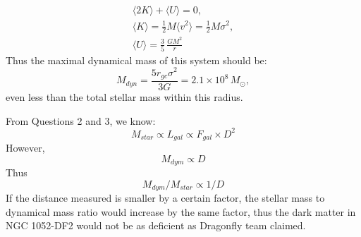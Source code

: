 \begin{description}
  \begin{gather*}
  \langle 2K \rangle + \langle U \rangle = 0, \\
  \langle K \rangle = \tfrac{1}{2}M\langle v^2 \rangle
  = \tfrac{1}{2}M\sigma^2, \\
  \langle U \rangle = \frac{3}{5}\,\frac{GM^2}{r}
  \tag*{(4 points)}
  \end{gather*}
  Thus the maximal dynamical mass of this system should be:
  \begin{equation*}
  M_{dyn} = \frac{5 r_{gc}\sigma^2}{3G} = 2.1 \times 10^{8}\,M_\odot,
  \tag*{(3 points)}
  \end{equation*}
  even less than the total stellar mass within this radius.
\item[(4)] From Questions 2 and 3, we know:
  \[
  M_{star} \propto L_{gal} \propto F_{gal} \times D^2
  \]
  However,
  \begin{equation*}
  M_{dym} \propto D %
  \tag*{(2 points)}
  \end{equation*}
  Thus
  \begin{equation*}
  M_{dym}/M_{star} \propto 1/D
  \tag*{(2 points)}
  \end{equation*}
  If the distance measured is smaller by a certain factor, the stellar mass to
  dynamical mass ratio would increase by the same factor, thus the dark matter
  in NGC 1052-DF2 would not be as deficient as Dragonfly team claimed.
\end{description}

